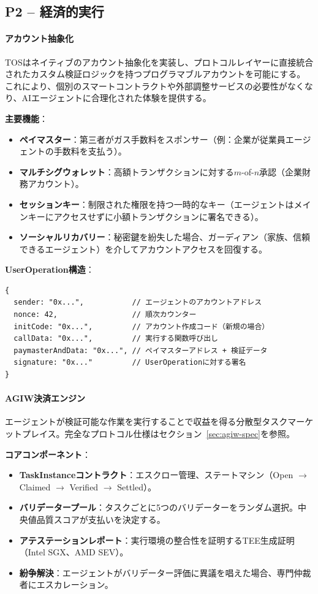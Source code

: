 \documentclass[11pt]{article}
\begin{document}
\subsection{P2 -- 経済的実行}
\label{sec:pillar-economic}

\paragraph{アカウント抽象化}
TOSはネイティブのアカウント抽象化を実装し、プロトコルレイヤーに直接統合されたカスタム検証ロジックを持つプログラマブルアカウントを可能にする。これにより、個別のスマートコントラクトや外部調整サービスの必要性がなくなり、AIエージェントに合理化された体験を提供する。

\textbf{主要機能}：
\begin{itemize}[noitemsep]
  \item \textbf{ペイマスター}：第三者がガス手数料をスポンサー（例：企業が従業員エージェントの手数料を支払う）。
  \item \textbf{マルチシグウォレット}：高額トランザクションに対する$m$-of-$n$承認（企業財務アカウント）。
  \item \textbf{セッションキー}：制限された権限を持つ一時的なキー（エージェントはメインキーにアクセスせずに小額トランザクションに署名できる）。
  \item \textbf{ソーシャルリカバリー}：秘密鍵を紛失した場合、ガーディアン（家族、信頼できるエージェント）を介してアカウントアクセスを回復する。
\end{itemize}

\textbf{UserOperation構造}：
\begin{verbatim}
{
  sender: "0x...",           // エージェントのアカウントアドレス
  nonce: 42,                 // 順次カウンター
  initCode: "0x...",         // アカウント作成コード（新規の場合）
  callData: "0x...",         // 実行する関数呼び出し
  paymasterAndData: "0x...", // ペイマスターアドレス + 検証データ
  signature: "0x..."         // UserOperationに対する署名
}
\end{verbatim}

\paragraph{AGIW決済エンジン}
エージェントが検証可能な作業を実行することで収益を得る分散型タスクマーケットプレイス。完全なプロトコル仕様はセクション~\ref{sec:agiw-spec}を参照。

\textbf{コアコンポーネント}：
\begin{itemize}[noitemsep]
  \item \textbf{TaskInstanceコントラクト}：エスクロー管理、ステートマシン（Open $\to$ Claimed $\to$ Verified $\to$ Settled）。
  \item \textbf{バリデータープール}：タスクごとに5つのバリデーターをランダム選択。中央値品質スコアが支払いを決定する。
  \item \textbf{アテステーションレポート}：実行環境の整合性を証明するTEE生成証明（Intel SGX、AMD SEV）。
  \item \textbf{紛争解決}：エージェントがバリデーター評価に異議を唱えた場合、専門仲裁者にエスカレーション。
\end{itemize}
\end{document}
